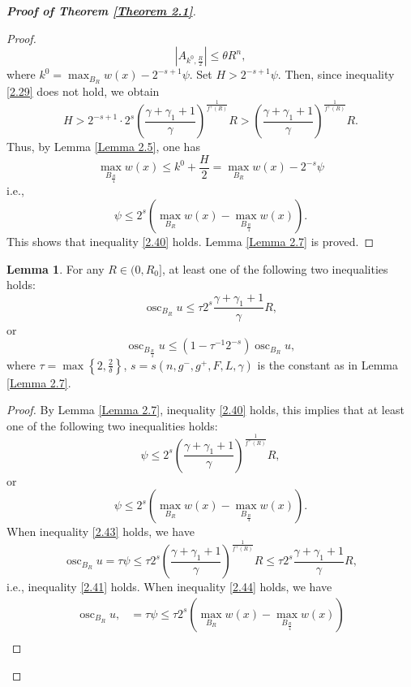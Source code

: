 \documentclass[10pt,reqno]{amsart}
\newcommand *\w{^\wedge}
\theoremstyle{definition}
\newtheorem{lemma}[theorem]{Lemma}
\numberwithin{equation}{section}
\begin{document}
\begin{proof}[\textbf{Proof of Theorem \ref{Theorem 2.1}}]
\begin{proof}
\[
|A_{k^0, \frac{R}{2}}| \leq \theta R^n,
\]
where \( k^0 = \max_{B_R} w(x) - 2^{-s+1} \psi \). Set \( H > 2^{-s+1} \psi \).
 Then, since inequality \eqref{2.29} does not hold, we obtain
\[
H > 2^{-s+1} \cdot 2^s \left( \frac{\gamma  + \gamma_1 + 1}{\gamma} \right)^{\frac{1}{f^+(R)}} R > \left( \frac{\gamma + \gamma_1 + 1}{\gamma} \right)^{\frac{1}{f^+(R)}} R.
\]
Thus, by Lemma \ref{Lemma 2.5}, one has
\[
\max_{B_{\frac{R}{4}}} w(x) \leq k^0 + \frac{H}{2} = \max_{B_R} w(x) - 2^{-s}\psi
\]
i.e.,
\[
\psi \leq 2^s \left( \max_{B_R} w(x) - \max_{B_{\frac{R}{4}}} w(x) \right).
\]
This shows that inequality \eqref{2.40} hol{\rm d}s. Lemma \ref{Lemma 2.7} is proved.
\end{proof}
\begin{lemma}\label{Lemma 2.8}
For any \(R \in (0, R_0]\), at least one of the following two inequalities hol{\rm d}s:
\begin{equation}\label{2.41}
\operatorname{osc}_{B_R}u \leq \tau 2^s \frac{\gamma + \gamma_1 + 1}{\gamma} R,
\end{equation}
or
\begin{equation}\label{2.42}
\operatorname{osc}_{B_{\frac{R}{4}}}u \leq (1 - \tau^{-1} 2^{-s}) \operatorname{osc}_{B_R}u,
\end{equation}
where \(\tau = \max \left\{2, \frac{2}{\delta}\right\}\), \(s = s(n, g^-, g^+, F,L, \gamma)\) is the constant as in Lemma \ref{Lemma 2.7}.
\end{lemma}
\begin{proof}
By Lemma \ref{Lemma 2.7}, inequality \eqref{2.40} hol{\rm d}s, this implies that at least one of the following two inequalities hol{\rm d}s:
\begin{equation}\label{2.43}
\psi \leq 2^s \left( \frac{\gamma  + \gamma_1 + 1}{\gamma} \right)^{\frac{1}{f^+(R)}} R,
\end{equation}
or
\begin{equation}\label{2.44}
\psi \leq 2^s \left( \max_{B_R} w(x) - \max_{B_{\frac{R}{4}}} w(x) \right).
\end{equation}
When inequality \eqref{2.43} hol{\rm d}s, we have
\[
\operatorname{osc}_{B_R}u = \tau \psi \leq \tau 2^s \left( \frac{\gamma  + \gamma_1 + 1}{\gamma} \right)^{\frac{1}{f^+(R)}} R \leq \tau 2^s \frac{\gamma + \gamma_1 + 1}{\gamma} R,
\]
i.e., inequality \eqref{2.41} hol{\rm d}s. When inequality \eqref{2.44} hol{\rm d}s, we have
\begin{align*}
\operatorname{osc}_{B_R}u, &= \tau \psi \leq \tau 2^s \left( \max_{B_R} w(x) - \max_{B_{\frac{R}{4}}} w(x) \right)\\

\end{align*}
\end{proof}
\end{proof}
\end{document}
